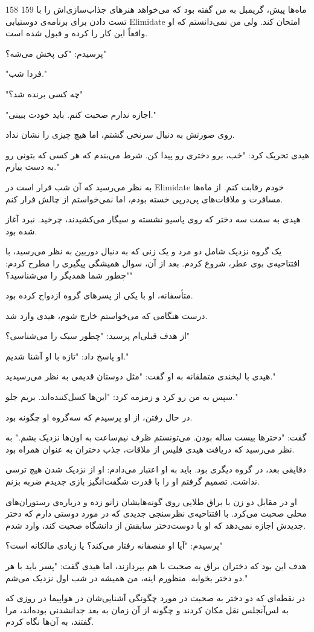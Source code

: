 158 159
ماه‌ها پیش، گریمبل به من گفته بود که می‌خواهد هنرهای جذاب‌سازی‌اش را با تست دادن برای برنامه‌ی دوستیابی Elimidate امتحان کند. ولی من نمی‌دانستم که او واقعاً این کار را کرده و قبول شده است.

پرسیدم: "کی پخش می‌شه؟"

"فردا شب."

"چه کسی برنده شد؟"

"اجازه ندارم صحبت کنم. باید خودت ببینی."

روی صورتش به دنبال سرنخی گشتم، اما هیچ چیزی را نشان نداد.

هیدی تحریک کرد: "خب، برو دختری رو پیدا کن. شرط می‌بندم که هر کسی که بتونی رو به دست بیارم."

به نظر می‌رسید که آن شب قرار است در Elimidate خودم رقابت کنم. از ماه‌ها مسافرت و ملاقات‌های پی‌درپی خسته بودم، اما نمی‌خواستم از چالش فرار کنم.

هیدی به سمت سه دختر که روی پاسیو نشسته و سیگار می‌کشیدند، چرخید. نبرد آغاز شده بود.

یک گروه نزدیک شامل دو مرد و یک زنی که به دنبال دوربین به نظر می‌رسید، با افتتاحیه‌ی بوی عطر، شروع کردم. بعد از آن، سوال همیشگی پیگیری را مطرح کردم: "چطور شما همدیگر را می‌شناسید؟"

متأسفانه، او با یکی از پسرهای گروه ازدواج کرده بود.

درست هنگامی که می‌خواستم خارج شوم، هیدی وارد شد.

از هدف قبلی‌ام پرسید: "چطور سبک را می‌شناسی؟"

او پاسخ داد: "تازه با او آشنا شدیم."

هیدی با لبخندی متملقانه به او گفت: "مثل دوستان قدیمی به نظر می‌رسیدید."

سپس به من رو کرد و زمزمه کرد: "این‌ها کسل‌کننده‌اند. بریم جلو."

در حال رفتن، از او پرسیدم که سه‌گروه او چگونه بود.

گفت: "دخترها بیست ساله بودن. می‌تونستم ظرف نیم‌ساعت به اون‌ها نزدیک بشم." به نظر می‌رسید که دریافت هیدی فلیس از ملاقات، جذب دختران به عنوان همراه بود.

دقایقی بعد، در گروه دیگری بود. باید به او اعتبار می‌دادم: او از نزدیک شدن هیچ ترسی نداشت. تصمیم گرفتم او را با قدرت شگفت‌انگیز بازی جدیدم ضربه بزنم.

او در مقابل دو زن با براق طلایی روی گونه‌هایشان زانو زده و درباره‌ی رستوران‌های محلی صحبت می‌کرد. با افتتاحیه‌ی نظرسنجی جدیدی که در مورد دوستی دارم که دختر جدیدش اجازه نمی‌دهد که او با دوست‌دختر سابقش از دانشگاه صحبت کند، وارد شدم.

پرسیدم: "آیا او منصفانه رفتار می‌کند؟ یا زیادی مالکانه است؟"

هدف این بود که دختران براق به صحبت با هم بپردازند، اما هیدی گفت: "پسر باید با هر دو دختر بخوابه. منظورم اینه، من همیشه در شب اول نزدیک می‌شم."

در نقطه‌ای که دو دختر به صحبت در مورد چگونگی آشنایی‌شان در هواپیما در روزی که به لس‌آنجلس نقل مکان کردند و چگونه از آن زمان به بعد جدانشدنی بوده‌اند، مرا گفتند، به آن‌ها نگاه کردم.